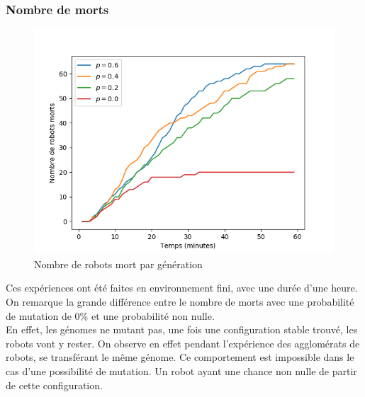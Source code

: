 \documentclass[a4paper]{article}
\begin{document}
\subsubsection{Nombre de morts}
\begin{figure}[h]
	\centering
	\begin{minipage}[c]{.46\linewidth}
		\centering
		\includegraphics[width=1.1\linewidth]{../../script_results/mEDEA_1_with_0.png}
		\caption{Nombre de robots mort par génération}
	\end{minipage}
\end{figure}
Ces expériences ont été faites en environnement fini, avec une durée d'une heure. On remarque la grande différence entre le nombre de morts avec une probabilité de mutation de 0\% et une probabilité non nulle.\\
En effet, les génomes ne mutant pas, une fois une configuration stable trouvé, les robots vont y rester. On observe en effet pendant l'expérience des agglomérats de robots, se transférant le même génome. Ce comportement est impossible dans le cas d'une possibilité de mutation. Un robot ayant une chance non nulle de partir de cette configuration.
\end{document}
